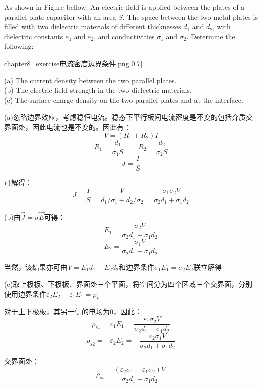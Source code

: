 \begin{solution}
    As shown in Figure bellow. An electric field is applied between the plates of a parallel plate capacitor with an area \( S \). The space between the two metal plates 
    is filled with two dielectric materials of different thicknesses \( d_1 \) and \( d_2 \), with dielectric constants \( \varepsilon_1 \) and \( \varepsilon_2 \), 
    and conductivities \( \sigma_1 \) and \( \sigma_2 \). Determine the following:
    \begin{singlefigure}{chapter8_exercise电流密度边界条件.png}[0.7]
    \end{singlefigure}
    
    (a) The current density between the two parallel plates.\\
    (b) The electric field strength in the two dielectric materials.\\
    (c) The surface charge density on the two parallel plates and at the interface.
    \tcbrule

    (a)忽略边界效应，考虑稳恒电流。稳态下平行板间电流密度是不变的包括介质交界面处，因此电流也是不变的。因此有：
    \[V = (R_1 + R_2)I\]
    \[R_1 = \dfrac{d_1}{\sigma_1 S}\qquad R_2 = \dfrac{d_2}{\sigma_2 S}\]
    \[J = \dfrac{I}{S}\]
    
    可解得：
    \[J = \dfrac{I}{S} = \dfrac{V}{d_1/\sigma_1 + d_2/\sigma_2} = \dfrac{\sigma_1\sigma_2 V}{\sigma_2 d_1 + \sigma_1 d_2}\]
    
    (b)由$\vec{J}=\sigma\vec{E}$可得：
    \[E_1 = \dfrac{\sigma_2 V}{\sigma_2 d_1 + \sigma_1 d_2}\]
    \[E_2 = \dfrac{\sigma_1 V}{\sigma_2 d_1 + \sigma_1 d_2}\]

    当然，该结果亦可由$V = E_1 d_1 + E_2 d_2$和边界条件$\sigma_1 E_1 = \sigma_2 E_2$联立解得

    (c)取上极板、下极板、界面处三个平面，将空间分为四个区域三个交界面，分别使用边界条件$\varepsilon_2 E_2 - \varepsilon_1 E_1 = \rho_s$

    对于上下极板，其另一侧的电场为0，因此：
    \[\rho_{s1} = \varepsilon_1 E_1 = \dfrac{\varepsilon_1\sigma_2 V}{\sigma_2 d_1 + \sigma_1 d_2}\]
    \[\rho_{s2} = -\varepsilon_2 E_2 = -\dfrac{\varepsilon_2\sigma_1 V}{\sigma_2 d_1 + \sigma_1 d_2}\]

    交界面处：
    \[\rho_{si} = \dfrac{(\varepsilon_2\sigma_1 - \varepsilon_1\sigma_2)V}{\sigma_2 d_1 + \sigma_1 d_2}\]
\end{solution}

